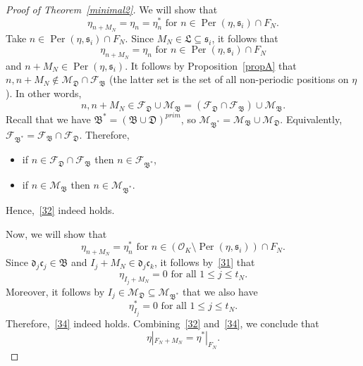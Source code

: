 \documentclass[leqno,a4paper,12pt]{article}
\theoremstyle{definition}
\newcommand{\Per}{\operatorname{Per}\nolimits}
\newcommand{\OK}{\mathcal{O}_K}
\begin{document}
\begin{proof}[Proof of Theorem~\ref{minimal2}]
We will show that
\begin{equation}\label{32}
\eta_{n+M_N}=\eta_n=\eta^*_n \text{ for }n\in\Per(\eta,\mathfrak{s}_i)\cap F_N.
\end{equation}
Take $n\in\Per(\eta,\mathfrak{s}_i)\cap F_N$. Since $M_N\in \mathfrak{L} \subseteq \mathfrak{s}_i$, it follows that
\begin{equation}\label{33}
\eta_{n+M_N}=\eta_n \text{ for }n\in\Per(\eta,\mathfrak{s}_i)\cap F_N
\end{equation}
and $n+M_N\in\Per(\eta,\mathfrak{s}_i)$. It follows by Proposition~\ref{propA} that $n,n+M_N\not\in\mathcal{M}_\mathfrak{D}\cap\mathcal{F}_\mathfrak{B}$ (the latter set is the set of all non-periodic positions on $\eta$). In other words,
\[
n,n+M_N\in\mathcal{F}_\mathfrak{D}\cup\mathcal{M}_\mathfrak{B}=(\mathcal{F}_\mathfrak{D}\cap\mathcal{F}_\mathfrak{B})\cup\mathcal{M}_\mathfrak{B}.
\]
Recall that we have $\mathfrak{B}^*=(\mathfrak{B}\cup\mathfrak{D})^{prim}$, so $\mathcal{M}_{\mathfrak{B}^*}=\mathcal{M}_\mathfrak{B}\cup\mathcal{M}_\mathfrak{D}$. Equivalently, $\mathcal{F}_{\mathfrak{B}^*}=\mathcal{F}_\mathfrak{B}\cap\mathcal{F}_\mathfrak{D}$. Therefore,
\begin{itemize}
\item if $n\in\mathcal{F}_\mathfrak{D}\cap\mathcal{F}_\mathfrak{B}$ then $n\in\mathcal{F}_{\mathfrak{B}^*}$,
\item if $n\in\mathcal{M}_\mathfrak{B}$ then $n\in\mathcal{M}_{\mathfrak{B}^*}$.
\end{itemize}
Hence,~\eqref{32} indeed holds.

Now, we will show that
\begin{equation}\label{34}
\eta_{n+M_N}=\eta^*_n \text{ for }n\in (\OK\setminus \Per(\eta,\mathfrak{s}_i))\cap F_N.
\end{equation}
Since $\mathfrak{d}_j\mathfrak{c}_j\in\mathfrak{B}$ and $I_j+M_N \in \mathfrak{d}_j\mathfrak{c}_k$, it follows by~\eqref{31} that
\begin{equation}\label{35}
\eta_{I_j+M_N}=0 \text{ for all } 1\leq j\leq t_N.
\end{equation}
Moreover, it follows by $I_j\in \mathcal{M}_{\mathfrak{D}}\subseteq \mathcal{M}_{\mathfrak{B}^*}$ that we also have
\[
\eta^*_{I_j}=0 \text{ for all }1\leq j\leq t_N.
\]
Therefore,~\eqref{34} indeed holds. Combining~\eqref{32} and~\eqref{34}, we conclude that
\begin{equation}\label{36}
\eta|_{F_N+M_N}=\eta^*|_{F_N}.
\end{equation}


\end{proof}
\end{document}
